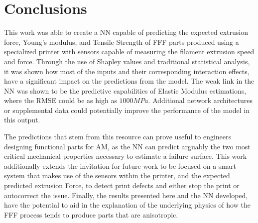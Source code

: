 \documentclass[main.tex]{subfiles}
\begin{document}
\section{Conclusions}

This work was able to create a NN capable of predicting the expected extrusion force, Young's modulus, and Tensile Strength of FFF parts produced using a specialized printer with sensors capable of measuring the filament extrusion speed and force. Through the use of Shapley values and traditional statistical analysis, it was shown how most of the inputs and their corresponding interaction effects, have a significant impact on the predictions from the model. The weak link in the NN was shown to be the predictive capabilities of Elastic Modulus estimations, where the RMSE could be as high as $1000 MPa$. Additional network architectures or supplemental data could potentially improve the performance of the model in this output. 

The predictions that stem from this resource can prove useful to engineers designing functional parts for AM, as the NN can predict arguably the two most critical mechanical properties necessary to estimate a failure surface. This work additionally extends the invitation for future work to be focused on a smart system that makes use of the sensors within the printer, and the expected predicted extrusion Force, to detect print defects and either stop the print or autocorrect the issue. Finally, the results presented here and the NN developed, have the potential to aid in the explanation of the underlying physics of how the FFF process tends to produce parts that are anisotropic.

% 
%
%
%
%
%
%
%

\end{document}
